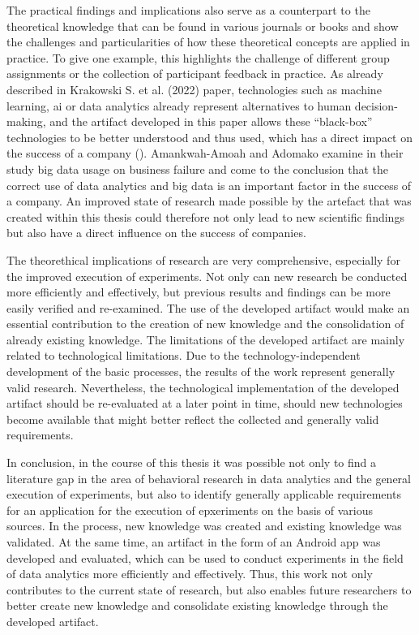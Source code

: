 The practical findings and implications also serve as a counterpart to the theoretical knowledge that can be found in various journals or books and show the challenges and particularities of how these theoretical concepts are applied in practice. To give one example, this highlights the challenge of different group assignments or the collection of participant feedback in practice. As already described in Krakowski S. et al. (2022) paper, technologies such as machine learning, \ac{ai} or data analytics already represent alternatives to human decision-making, and the artifact developed in this paper allows these \enquote{black-box} technologies to be better understood and thus used, which has a direct impact on the success of a company (\cite{Krakowski.2023}). Amankwah-Amoah and Adomako examine in their study big data usage on business failure and come to the conclusion that the correct use of data analytics and big data is an important factor in the success of a company. An improved state of research made possible by the artefact that was created within this thesis could therefore not only lead to new scientific findings but also have a direct influence on the success of companies.

The theorethical implications of research are very comprehensive, especially for the improved execution of experiments. Not only can new research be conducted more efficiently and effectively, but previous results and findings can be more easily verified and re-examined. The use of the developed artifact would make an essential contribution to the creation of new knowledge and the consolidation of already existing knowledge. The limitations of the developed artifact are mainly related to technological limitations. Due to the technology-independent development of the basic processes, the results of the work represent generally valid research. Nevertheless, the technological implementation of the developed artifact should be re-evaluated at a later point in time, should new technologies become available that might better reflect the collected and generally valid requirements.

In conclusion, in the course of this thesis it was possible not only to find a literature gap in the area of behavioral research in data analytics and the general execution of experiments, but also to identify generally applicable requirements for an application for the execution of epxeriments on the basis of various sources. In the process, new knowledge was created and existing knowledge was validated. At the same time, an artifact in the form of an Android app was developed and evaluated, which can be used to conduct experiments in the field of data analytics more efficiently and effectively. Thus, this work not only contributes to the current state of research, but also enables future researchers to better create new knowledge and consolidate existing knowledge through the developed artifact.

